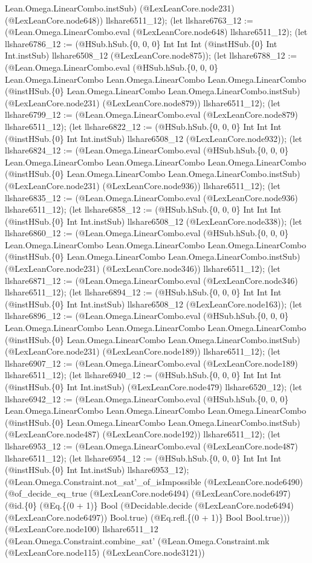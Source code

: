 \documentclass[11pt]{article}
\begin{document}
Lean.Omega.LinearCombo.instSub) (@LexLeanCore.node231) (@LexLeanCore.node648)) llshare6511\_12); (let llshare6763\_12 := (@Lean.Omega.LinearCombo.eval (@LexLeanCore.node648) llshare6511\_12); (let llshare6786\_12 := (@HSub.hSub.\{0, 0, 0\} Int Int Int (@instHSub.\{0\} Int Int.instSub) llshare6508\_12 (@LexLeanCore.node875)); (let llshare6788\_12 := (@Lean.Omega.LinearCombo.eval (@HSub.hSub.\{0, 0, 0\} Lean.Omega.LinearCombo Lean.Omega.LinearCombo Lean.Omega.LinearCombo (@instHSub.\{0\} Lean.Omega.LinearCombo Lean.Omega.LinearCombo.instSub) (@LexLeanCore.node231) (@LexLeanCore.node879)) llshare6511\_12); (let llshare6799\_12 := (@Lean.Omega.LinearCombo.eval (@LexLeanCore.node879) llshare6511\_12); (let llshare6822\_12 := (@HSub.hSub.\{0, 0, 0\} Int Int Int (@instHSub.\{0\} Int Int.instSub) llshare6508\_12 (@LexLeanCore.node932)); (let llshare6824\_12 := (@Lean.Omega.LinearCombo.eval (@HSub.hSub.\{0, 0, 0\} Lean.Omega.LinearCombo Lean.Omega.LinearCombo Lean.Omega.LinearCombo (@instHSub.\{0\} Lean.Omega.LinearCombo Lean.Omega.LinearCombo.instSub) (@LexLeanCore.node231) (@LexLeanCore.node936)) llshare6511\_12); (let llshare6835\_12 := (@Lean.Omega.LinearCombo.eval (@LexLeanCore.node936) llshare6511\_12); (let llshare6858\_12 := (@HSub.hSub.\{0, 0, 0\} Int Int Int (@instHSub.\{0\} Int Int.instSub) llshare6508\_12 (@LexLeanCore.node338)); (let llshare6860\_12 := (@Lean.Omega.LinearCombo.eval (@HSub.hSub.\{0, 0, 0\} Lean.Omega.LinearCombo Lean.Omega.LinearCombo Lean.Omega.LinearCombo (@instHSub.\{0\} Lean.Omega.LinearCombo Lean.Omega.LinearCombo.instSub) (@LexLeanCore.node231) (@LexLeanCore.node346)) llshare6511\_12); (let llshare6871\_12 := (@Lean.Omega.LinearCombo.eval (@LexLeanCore.node346) llshare6511\_12); (let llshare6894\_12 := (@HSub.hSub.\{0, 0, 0\} Int Int Int (@instHSub.\{0\} Int Int.instSub) llshare6508\_12 (@LexLeanCore.node163)); (let llshare6896\_12 := (@Lean.Omega.LinearCombo.eval (@HSub.hSub.\{0, 0, 0\} Lean.Omega.LinearCombo Lean.Omega.LinearCombo Lean.Omega.LinearCombo (@instHSub.\{0\} Lean.Omega.LinearCombo Lean.Omega.LinearCombo.instSub) (@LexLeanCore.node231) (@LexLeanCore.node189)) llshare6511\_12); (let llshare6907\_12 := (@Lean.Omega.LinearCombo.eval (@LexLeanCore.node189) llshare6511\_12); (let llshare6940\_12 := (@HSub.hSub.\{0, 0, 0\} Int Int Int (@instHSub.\{0\} Int Int.instSub) (@LexLeanCore.node479) llshare6520\_12); (let llshare6942\_12 := (@Lean.Omega.LinearCombo.eval (@HSub.hSub.\{0, 0, 0\} Lean.Omega.LinearCombo Lean.Omega.LinearCombo Lean.Omega.LinearCombo (@instHSub.\{0\} Lean.Omega.LinearCombo Lean.Omega.LinearCombo.instSub) (@LexLeanCore.node487) (@LexLeanCore.node192)) llshare6511\_12); (let llshare6953\_12 := (@Lean.Omega.LinearCombo.eval (@LexLeanCore.node487) llshare6511\_12); (let llshare6954\_12 := (@HSub.hSub.\{0, 0, 0\} Int Int Int (@instHSub.\{0\} Int Int.instSub) llshare6953\_12); (@Lean.Omega.Constraint.not\_sat'\_of\_isImpossible (@LexLeanCore.node6490) (@of\_decide\_eq\_true (@LexLeanCore.node6494) (@LexLeanCore.node6497) (@id.\{0\} (@Eq.\{(0 + 1)\} Bool (@Decidable.decide (@LexLeanCore.node6494) (@LexLeanCore.node6497)) Bool.true) (@Eq.refl.\{(0 + 1)\} Bool Bool.true))) (@LexLeanCore.node100) llshare6511\_12 (@Lean.Omega.Constraint.combine\_sat' (@Lean.Omega.Constraint.mk (@LexLeanCore.node115) (@LexLeanCore.node3121)) 
\end{document}
